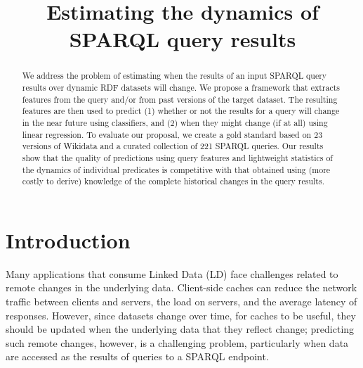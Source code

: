 \documentclass[runningheads]{llncs}
\begin{document}
%
\title{Estimating the dynamics of SPARQL query results
}
%
%
%
%
%
\maketitle              %
%
\begin{abstract}
We address the problem of estimating when the results of an input SPARQL query results over dynamic RDF datasets will change. We propose a framework that extracts features from the query and/or from past versions of the target dataset. The resulting features are then used to predict (1) whether or not the results for a query will change in the near future using classifiers, and (2) when they might change (if at all) using linear regression. To evaluate our proposal, we create a gold standard based on 23 versions of Wikidata and a curated collection of 221 SPARQL queries. Our results show that the quality of predictions using query features and lightweight statistics of the dynamics of individual predicates is competitive with that obtained using (more costly to derive) knowledge of the complete historical changes in the query results.

\end{abstract}
%
%
\section{Introduction}
\label{sec:intro}
%
Many applications that consume Linked Data (LD) face challenges related to remote changes in the underlying data. Client-side caches can reduce the network traffic between clients and servers, the load on servers, and the average latency of responses. However, since datasets change over time, for caches to be useful, they should be updated when the underlying data that they reflect change; predicting such remote changes, however, is a challenging problem, particularly when data are accessed as the results of queries to a SPARQL endpoint.
\end{document}
